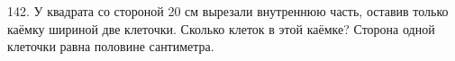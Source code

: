 142. У квадрата со стороной 20 см вырезали внутреннюю часть, оставив только каёмку шириной две клеточки. Сколько клеток в этой каёмке? Сторона одной клеточки равна половине сантиметра.\\
